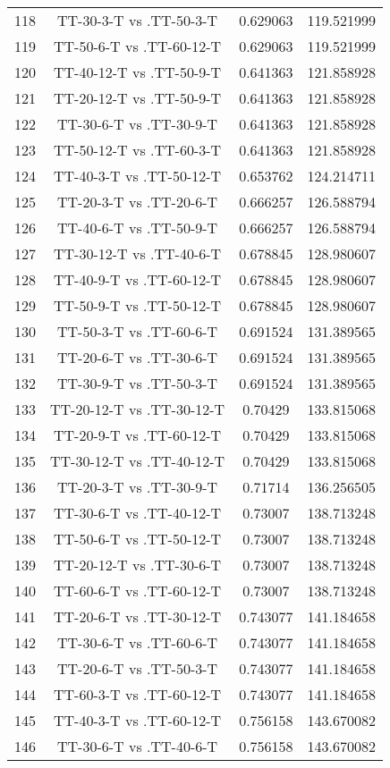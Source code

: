 \documentclass[a4paper,10pt]{article}
\begin{document}
\begin{landscape}
\begin{table}[!htp]
\begin{tabular}{cccc}
118&TT-30-3-T vs .TT-50-3-T&0.629063&119.521999\\
119&TT-50-6-T vs .TT-60-12-T&0.629063&119.521999\\
120&TT-40-12-T vs .TT-50-9-T&0.641363&121.858928\\
121&TT-20-12-T vs .TT-50-9-T&0.641363&121.858928\\
122&TT-30-6-T vs .TT-30-9-T&0.641363&121.858928\\
123&TT-50-12-T vs .TT-60-3-T&0.641363&121.858928\\
124&TT-40-3-T vs .TT-50-12-T&0.653762&124.214711\\
125&TT-20-3-T vs .TT-20-6-T&0.666257&126.588794\\
126&TT-40-6-T vs .TT-50-9-T&0.666257&126.588794\\
127&TT-30-12-T vs .TT-40-6-T&0.678845&128.980607\\
128&TT-40-9-T vs .TT-60-12-T&0.678845&128.980607\\
129&TT-50-9-T vs .TT-50-12-T&0.678845&128.980607\\
130&TT-50-3-T vs .TT-60-6-T&0.691524&131.389565\\
131&TT-20-6-T vs .TT-30-6-T&0.691524&131.389565\\
132&TT-30-9-T vs .TT-50-3-T&0.691524&131.389565\\
133&TT-20-12-T vs .TT-30-12-T&0.70429&133.815068\\
134&TT-20-9-T vs .TT-60-12-T&0.70429&133.815068\\
135&TT-30-12-T vs .TT-40-12-T&0.70429&133.815068\\
136&TT-20-3-T vs .TT-30-9-T&0.71714&136.256505\\
137&TT-30-6-T vs .TT-40-12-T&0.73007&138.713248\\
138&TT-50-6-T vs .TT-50-12-T&0.73007&138.713248\\
139&TT-20-12-T vs .TT-30-6-T&0.73007&138.713248\\
140&TT-60-6-T vs .TT-60-12-T&0.73007&138.713248\\
141&TT-20-6-T vs .TT-30-12-T&0.743077&141.184658\\
142&TT-30-6-T vs .TT-60-6-T&0.743077&141.184658\\
143&TT-20-6-T vs .TT-50-3-T&0.743077&141.184658\\
144&TT-60-3-T vs .TT-60-12-T&0.743077&141.184658\\
145&TT-40-3-T vs .TT-60-12-T&0.756158&143.670082\\
146&TT-30-6-T vs .TT-40-6-T&0.756158&143.670082\\

\end{tabular}
\end{table}
\end{landscape}
\end{document}
